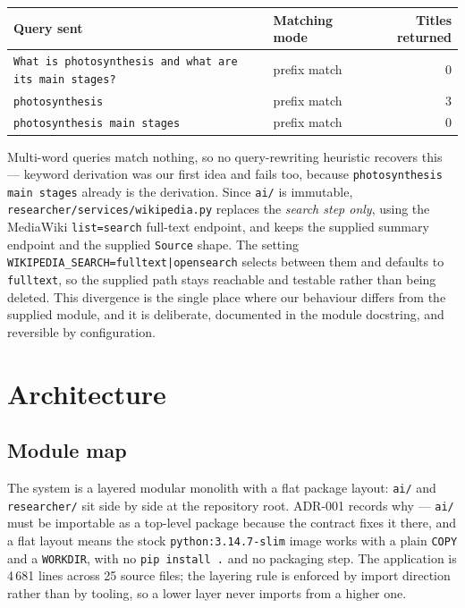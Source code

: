 \documentclass[10pt,a4paper]{article}
\begin{document}
\begin{center}
\footnotesize
\begin{tabular}{@{}llr@{}}
\toprule
\textbf{Query sent} & \textbf{Matching mode} & \textbf{Titles returned} \\
\midrule
\texttt{What is photosynthesis and what are its main stages?} & prefix match & 0 \\
\texttt{photosynthesis} & prefix match & 3 \\
\texttt{photosynthesis main stages} & prefix match & 0 \\
\bottomrule
\end{tabular}
\end{center}

Multi-word queries match nothing, so no query-rewriting heuristic recovers this --- keyword
derivation was our first idea and fails too, because \texttt{photosynthesis main stages} already
is the derivation. Since \texttt{ai/} is
immutable, \texttt{researcher/services/wikipedia.py} replaces the \emph{search step only},
using the MediaWiki \texttt{list=search} full-text endpoint, and keeps the supplied summary
endpoint and the supplied \texttt{Source} shape. The setting
\texttt{WIKIPEDIA\_SEARCH=fulltext|opensearch} selects between them and defaults to
\texttt{fulltext}, so the supplied path stays reachable and testable rather than being deleted.
This divergence is the single place where our behaviour differs from the supplied module, and it
is deliberate, documented in the module docstring, and reversible by configuration.

\section{Architecture}

\subsection{Module map}

The system is a layered modular monolith with a flat package layout: \texttt{ai/} and
\texttt{researcher/} sit side by side at the repository root. ADR-001 records why ---
\texttt{ai/} must be importable as a top-level package because the contract fixes it there, and a
flat layout means the stock \texttt{python:3.14.7-slim} image works with a plain
\texttt{COPY} and a \texttt{WORKDIR}, with no \texttt{pip install .} and no packaging step. The application is 4\,681 lines across 25 source files; the layering rule is enforced
by import direction rather than by tooling, so a lower layer never imports from a higher one.
\end{document}
